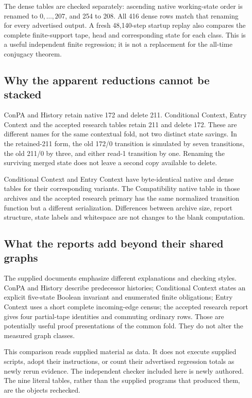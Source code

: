 \documentclass[11pt,letterpaper]{article}
\begin{document}
The dense tables are checked separately: ascending native working-state order
is renamed to $0,\ldots,207$, and 254 to 208. All 416 dense rows match that
renaming for every advertised output. A fresh 48,140-step startup replay
also compares the complete finite-support tape, head and corresponding state
for each class. This is a useful independent finite regression; it is not a
replacement for the all-time conjugacy theorem.

\subsection{Why the apparent reductions cannot be stacked}
ConPA and History retain native 172 and delete 211. Conditional Context,
Entry Context and the accepted research tables retain 211 and delete 172.
These are different names for the same contextual fold, not two distinct
state savings. In the retained-211 form, the old 172/0 transition is simulated
by seven transitions, the old 211/0 by three, and either read-1 transition
by one. Renaming the surviving merged state does not leave a second copy
available to delete.

Conditional Context and Entry Context have byte-identical native and dense
tables for their corresponding variants. The Compatibility native table in
those archives and the accepted research primary has the same normalized
transition function but a different serialization. Differences between
archive size, report structure, state labels and whitespace are not changes
to the blank computation.

\subsection{What the reports add beyond their shared graphs}
The supplied documents emphasize different explanations and checking styles.
ConPA and History describe predecessor histories; Conditional Context states
an explicit five-state Boolean invariant and enumerated finite obligations;
Entry Context uses a short complete incoming-edge census; the accepted
research report gives four partial-tape identities and commuting ordinary
rows. Those are potentially useful proof presentations of the common fold.
They do not alter the measured graph classes.

This comparison reads supplied material as data. It does not execute supplied
scripts, adopt their instructions, or count their advertised regression totals
as newly rerun evidence. The independent checker included here is newly
authored. The nine literal tables, rather than the supplied programs that
produced them, are the objects rechecked.
\end{document}
